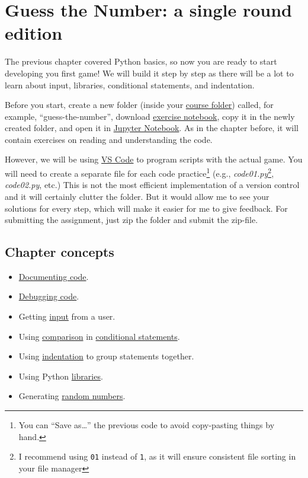 \documentclass[
]{book}
\providecommand{\tightlist}{%
  \setlength{\itemsep}{0pt}\setlength{\parskip}{0pt}}
\begin{document}
\hypertarget{guess-the-number-single-round}{%
\chapter{Guess the Number: a single round edition}\label{guess-the-number-single-round}}

The previous chapter covered Python basics, so now you are ready to start developing you first game! We will build it step by step as there will be a lot to learn about input, libraries, conditional statements, and indentation.

Before you start, create a new folder (inside your \protect\hyperlink{files-folder}{course folder}) called, for example, ``guess-the-number'', download \href{notebooks/Seminar\%2002.\%20Guess\%20the\%20number\%20-\%20single\%20round.ipynb}{exercise notebook}, copy it in the newly created folder, and open it in \protect\hyperlink{jupyter-notebooks}{Jupyter Notebook}. As in the chapter before, it will contain exercises on reading and understanding the code.

However, we will be using \protect\hyperlink{install-vs-code}{VS Code} to program scripts with the actual game. You will need to create a separate file for each code practice\footnote{You can ``Save as\ldots{}'' the previous code to avoid copy-pasting things by hand.} (e.g., \emph{code01.py}\footnote{I recommend using \texttt{01} instead of \texttt{1}, as it will ensure consistent file sorting in your file manager}, \emph{code02.py}, etc.) This is not the most efficient implementation of a version control and it will certainly clutter the folder. But it would allow me to see your solutions for every step, which will make it easier for me to give feedback. For submitting the assignment, just zip the folder and submit the zip-file.

\hypertarget{chapter-concepts-1}{%
\section{Chapter concepts}\label{chapter-concepts-1}}

\begin{itemize}
\tightlist
\item
  \protect\hyperlink{documenting-your-code}{Documenting code}.
\item
  \protect\hyperlink{debugging}{Debugging code}.
\item
  Getting \protect\hyperlink{input-function}{input} from a user.
\item
  Using \protect\hyperlink{comparisons}{comparison} in \protect\hyperlink{if-statement}{conditional statements}.
\item
  Using \protect\hyperlink{indentation}{indentation} to group statements together.
\item
  Using Python \protect\hyperlink{using-libraries}{libraries}.
\item
  Generating \protect\hyperlink{picking-a-number-randomly}{random numbers}.
\end{itemize}
\end{document}
